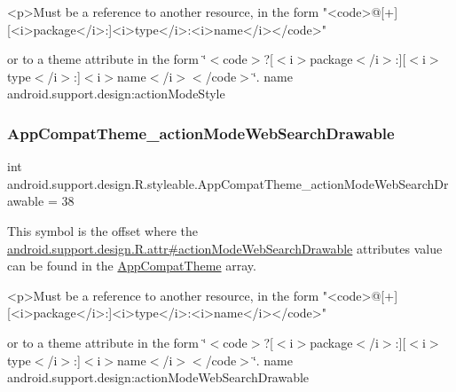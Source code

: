 \begin{DoxyVerb}      <p>Must be a reference to another resource, in the form "<code>@[+][<i>package</i>:]<i>type</i>:<i>name</i></code>"
\end{DoxyVerb}
 or to a theme attribute in the form \char`\"{}$<$code$>$?\mbox{[}$<$i$>$package$<$/i$>$\+:\mbox{]}\mbox{[}$<$i$>$type$<$/i$>$\+:\mbox{]}$<$i$>$name$<$/i$>$$<$/code$>$\char`\"{}.  name android.\+support.\+design\+:action\+Mode\+Style \mbox{\label{classandroid_1_1support_1_1design_1_1R_1_1styleable_a3150922f00e1e78287f30e03ef037a0a}} 
\subsubsection{\texorpdfstring{App\+Compat\+Theme\+\_\+action\+Mode\+Web\+Search\+Drawable}{AppCompatTheme\_actionModeWebSearchDrawable}}
{\footnotesize\ttfamily int android.\+support.\+design.\+R.\+styleable.\+App\+Compat\+Theme\+\_\+action\+Mode\+Web\+Search\+Drawable = 38\hspace{0.3cm}{\ttfamily [static]}}

This symbol is the offset where the \hyperlink{classandroid_1_1support_1_1design_1_1R_1_1attr_a06691df3ec2afae16de6a1473fa93551}{android.\+support.\+design.\+R.\+attr\#action\+Mode\+Web\+Search\+Drawable} attribute\textquotesingle{}s value can be found in the \hyperlink{classandroid_1_1support_1_1design_1_1R_1_1styleable_afb351dc8de20cbd4c89abe360373010c}{App\+Compat\+Theme} array.

\begin{DoxyVerb}      <p>Must be a reference to another resource, in the form "<code>@[+][<i>package</i>:]<i>type</i>:<i>name</i></code>"
\end{DoxyVerb}
 or to a theme attribute in the form \char`\"{}$<$code$>$?\mbox{[}$<$i$>$package$<$/i$>$\+:\mbox{]}\mbox{[}$<$i$>$type$<$/i$>$\+:\mbox{]}$<$i$>$name$<$/i$>$$<$/code$>$\char`\"{}.  name android.\+support.\+design\+:action\+Mode\+Web\+Search\+Drawable \mbox{\label{classandroid_1_1support_1_1design_1_1R_1_1styleable_a1a82f2c29c2dd5fb202086c562a387a4}} 
